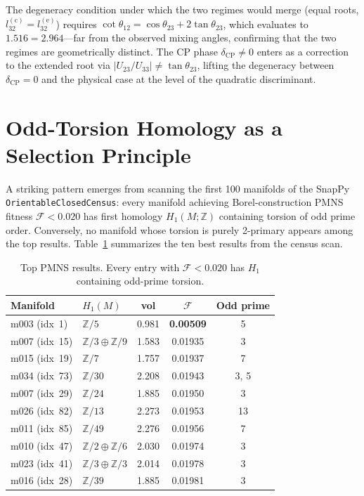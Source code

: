 \documentclass[11pt,a4paper]{article}
\begin{document}
\noindent
The degeneracy condition under which the two regimes would merge
(equal roots, $l_{32}^{(\mathrm{c})} = l_{32}^{(\mathrm{e})}$)
requires $\cot\theta_{12} = \cos\theta_{23} + 2\tan\theta_{23}$,
which evaluates to $1.516 = 2.964$---far from the observed mixing
angles, confirming that the two regimes are geometrically distinct.
The CP phase $\delta_{\mathrm{CP}} \neq 0$ enters as a correction to
the extended root via $|U_{23}/U_{33}| \neq \tan\theta_{23}$, lifting
the degeneracy between $\delta_{\mathrm{CP}} = 0$ and the physical
case at the level of the quadratic discriminant.

\section{Odd-Torsion Homology as a Selection Principle}
\label{sec:homology}

A striking pattern emerges from scanning the first 100 manifolds of
the SnapPy \texttt{OrientableClosedCensus}: every manifold achieving
Borel-construction PMNS fitness $\mathcal{F} < 0.020$ has first
homology $H_1(M;\mathbb{Z})$ containing torsion of odd prime order.
Conversely, no manifold whose torsion is purely 2-primary appears
among the top results. Table~\ref{tab:homology_pattern} summarizes
the ten best results from the census scan.

\begin{table}[!t]
\centering
\caption{Top PMNS results. Every entry with $\mathcal{F} < 0.020$
has $H_1$ containing odd-prime torsion.}
\label{tab:homology_pattern}
\begin{tabular}{llccc}
\toprule
Manifold & $H_1(M)$ & vol & $\mathcal{F}$ & Odd prime \\
\midrule
m003 (idx~1)  & $\mathbb{Z}/5$                          & 0.981 & \textbf{0.00509} & 5 \\
m007 (idx~15) & $\mathbb{Z}/3\oplus\mathbb{Z}/9$        & 1.583 & 0.01935 & 3 \\
m015 (idx~19) & $\mathbb{Z}/7$                          & 1.757 & 0.01937 & 7 \\
m034 (idx~73) & $\mathbb{Z}/30$                         & 2.208 & 0.01943 & 3, 5 \\
m007 (idx~29) & $\mathbb{Z}/24$                         & 1.885 & 0.01950 & 3 \\
m026 (idx~82) & $\mathbb{Z}/13$                         & 2.273 & 0.01953 & 13 \\
m011 (idx~85) & $\mathbb{Z}/49$                         & 2.276 & 0.01956 & 7 \\
m010 (idx~47) & $\mathbb{Z}/2\oplus\mathbb{Z}/6$        & 2.030 & 0.01974 & 3 \\
m023 (idx~41) & $\mathbb{Z}/3\oplus\mathbb{Z}/3$        & 2.014 & 0.01978 & 3 \\
m016 (idx~28) & $\mathbb{Z}/39$                         & 1.885 & 0.01981 & 3 \\
\bottomrule
\end{tabular}
\end{table}
\end{document}
